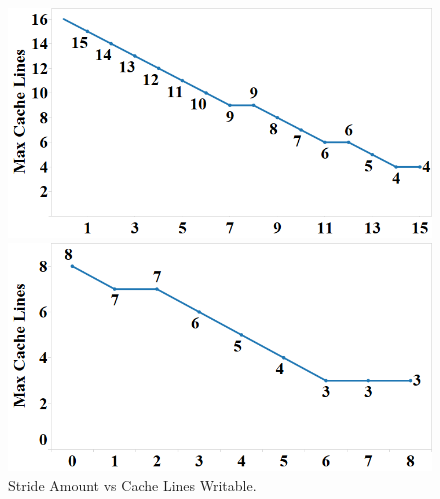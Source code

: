 \begin{figure}[h]
\centering
\begin{minipage}[b]{.45\linewidth}
\centering
\includegraphics[width=\linewidth]{images/wttm_stride_read_intel}
\caption{Stride Amount vs Cache Lines Readable. 
}
\label{fig:wttm_stride_read_intel}
\end{minipage}%
\quad
\begin{minipage}[b]{.45\linewidth}
\centering
\includegraphics[width=\linewidth]{images/wttm_stride_write_intel}
\caption{Stride Amount vs Cache Lines Writable. 
}
\label{fig:wttm_stride_write_intel}
\end{minipage}
\end{figure}

